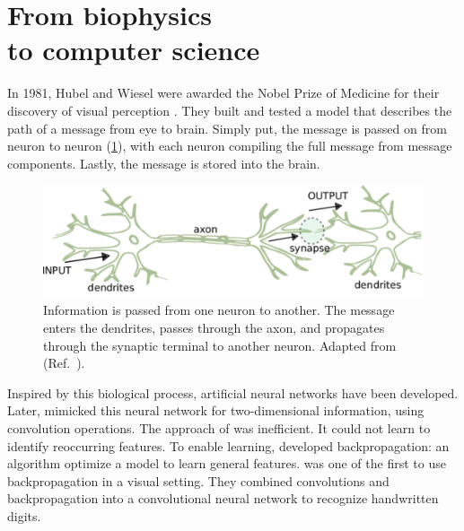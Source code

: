 \section[From biophysics to computer science]{From biophysics \\ to computer science}

In 1981, Hubel and Wiesel were awarded the Nobel Prize of Medicine for their discovery of visual perception \cite{NP1981}.
They built and tested a model that describes the path of a message from eye to brain.
Simply put, the message is passed on from neuron to neuron (\cref{fig:synapse}), with each neuron compiling the full message from message components.
Lastly, the message is stored into the brain.

\begin{figure}
    \centering
    \includegraphics[width=\linewidth]{ANN/images/neural-network.png}
    \caption[Two neurons exchanging information]{
        Information is passed from one neuron to another.
        The message enters the dendrites, passes through the axon, and propagates through the synaptic terminal to another neuron.
        Adapted from  (Ref.~\cite{Gerstner2002}).
    }
    \label{fig:synapse}
\end{figure}

Inspired by this biological process, artificial neural networks have been developed.
Later, \textcite{Fukushima1980} mimicked this neural network for two-dimensional information, using convolution operations.
The approach of \citeauthor{Fukushima1980} was inefficient.
It could not learn to identify reoccurring features.
To enable learning, \textcite{Rumelhart1986} developed backpropagation: an algorithm optimize a model to learn general features.
\textcite{LeCun1990} was one of the first to use backpropagation in a visual setting.
They combined convolutions and backpropagation into a convolutional neural network to recognize handwritten digits.


